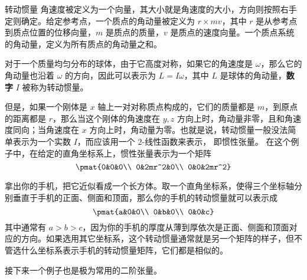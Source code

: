 \begin{example}{转动惯量}
角速度被定义为一个向量，其大小就是角速度的大小，方向则按照右手定则确定。给定参考点，一个质点的角动量被定义为 ${r}\times m{v}$，其中 ${r}$ 是从参考点到质点位置的位移向量，$m$ 是质点的质量，${v}$ 是质点的速度向量。一个质点系统的角动量，定义为所有质点的角动量之和。

对于一个质量均匀分布的球体，由于它高度对称，如果它的角速度是 ${\omega}$，那么它的角动量也沿着 ${\omega}$ 的方向，因此可以表示为 ${L}=I{\omega}$，其中 ${L}$ 是球体的角动量，\textbf{数字} $I$ 被称为转动惯量。

但是，如果一个刚体是 $x$ 轴上一对对称质点构成的，它们的质量都是 $m$，到原点的距离都是 $r$，那么当这个刚体的角速度在 $y,z$ 方向上时，角动量非零，且和角速度同向；当角速度在 $x$ 方向上时，角动量为零。也就是说，转动惯量一般没法简单表示为一个实数 $I$，而应该用一个 $2$-线性函数来表示， 即惯性张量。 在这个例子中，在给定的直角坐标系上，惯性张量表示为一个矩阵
\begin{equation}
\pmat{0&0&0\\ 0&2mr^2&0\\ 0&0&2mr^2}
\end{equation}

拿出你的手机，把它近似看成一个长方体。取一个直角坐标系，使得三个坐标轴分别垂直于手机的正面、侧面和顶面，那么你的手机的转动惯量就可以表示成
\begin{equation}
\pmat{a&0&0\\ 0&b&0\\ 0&0&c}
\end{equation}
其中通常有 $a>b>c$，因为你的手机的厚度从薄到厚依次是正面、侧面和顶面对应的方向。如果选用其它坐标系，这个转动惯量通常就是另一个矩阵的样子，但不管选什么坐标系表示手机的转动惯量矩阵，它们都是相似的。
\end{example}

接下来一个例子也是极为常用的二阶张量。


